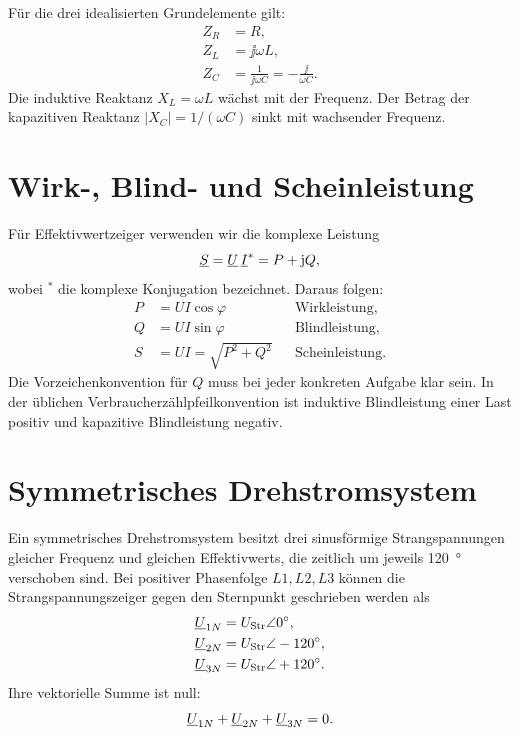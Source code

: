 Für die drei idealisierten Grundelemente gilt:
\begin{align}
  Z_R &= R,\\
  Z_L &= \jj\omega L,\\
  Z_C &= \frac{1}{\jj\omega C}=-\frac{\jj}{\omega C}.
\end{align}
Die induktive Reaktanz \(X_L=\omega L\) wächst mit der Frequenz.
Der Betrag der kapazitiven Reaktanz \( |X_C|=1/(\omega C) \) sinkt mit
wachsender Frequenz.

\section{Wirk-, Blind- und Scheinleistung}

Für Effektivwertzeiger verwenden wir die komplexe Leistung
\begin{equation}
  \underline S=\underline{U}\,\underline{I}^{*}=P+\mathrm{j} Q,
  \label{eq:komplexeleistung}
\end{equation}
wobei \(^{*}\) die komplexe Konjugation bezeichnet. Daraus folgen:
\begin{align}
  P &= UI\cos\varphi && \text{Wirkleistung},\\
  Q &= UI\sin\varphi && \text{Blindleistung},\\
  S &= UI=\sqrt{P^2+Q^2} && \text{Scheinleistung}.
\end{align}
Die Vorzeichenkonvention für \(Q\) muss bei jeder konkreten Aufgabe klar sein.
In der üblichen Verbraucherzählpfeilkonvention ist induktive Blindleistung
einer Last positiv und kapazitive Blindleistung negativ.

\section{Symmetrisches Drehstromsystem}

Ein symmetrisches Drehstromsystem besitzt drei sinusförmige Strangspannungen
gleicher Frequenz und gleichen Effektivwerts, die zeitlich um jeweils
\SI{120}{\degree} verschoben sind. Bei positiver Phasenfolge \(L1,L2,L3\)
können die Strangspannungszeiger gegen den Sternpunkt geschrieben werden als
\begin{align}
  \underline{U}_{1N}&=U_\mathrm{Str}\angle 0^\circ,\\
  \underline{U}_{2N}&=U_\mathrm{Str}\angle -120^\circ,\\
  \underline{U}_{3N}&=U_\mathrm{Str}\angle +120^\circ.
\end{align}
Ihre vektorielle Summe ist null:
\[
\underline{U}_{1N}+\underline{U}_{2N}+\underline{U}_{3N}=0.
\]

